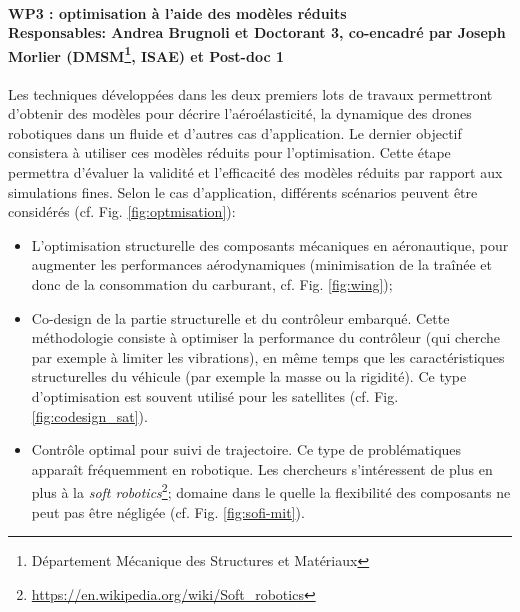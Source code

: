 \documentclass[12pt, french]{article}
\begin{document}
	
	\paragraph[\large WP3 : optimisation à l'aide des modèles réduits\\
	Responsables: Andrea Brugnoli et Doctorant 3, co-encadré par Joseph Morlier (DMSM, ISAE) et Post-doc 1\\]{\large WP3 : optimisation à l'aide des modèles réduits\\
		Responsables: Andrea Brugnoli et Doctorant 3, co-encadré par Joseph Morlier (DMSM\footnote{Département Mécanique des Structures et Matériaux}, ISAE) et Post-doc 1\\}
	
	Les techniques développées dans les deux premiers lots de travaux permettront d'obtenir des modèles pour décrire l'aéroélasticité, la dynamique des drones robotiques dans un fluide et d'autres cas d'application.
	Le dernier objectif consistera à utiliser ces modèles réduits pour l'optimisation. Cette étape permettra d'évaluer la validité et l'efficacité des modèles réduits par rapport aux simulations fines. Selon le cas d'application, différents scénarios peuvent être considérés (cf. Fig. \ref{fig:optmisation}): 
	\begin{itemize}
		\item L'optimisation structurelle des composants mécaniques en aéronautique, pour augmenter les performances aérodynamiques (minimisation de la traînée et donc de la consommation du carburant, cf. Fig. \ref{fig:wing}); 
		\item Co-design de la partie structurelle et du contrôleur embarqué. Cette méthodologie consiste à optimiser la performance du contrôleur (qui cherche par exemple à limiter les vibrations), en même temps que les caractéristiques structurelles du véhicule (par exemple la masse ou la rigidité). Ce type d'optimisation est souvent utilisé pour les satellites (cf. Fig. \ref{fig:codesign_sat}).
		\item Contrôle optimal pour suivi de trajectoire. Ce type de problématiques apparaît fréquemment en robotique. Les chercheurs s'intéressent de plus en plus à la \textit{soft robotics}\footnote{\url{https://en.wikipedia.org/wiki/Soft_robotics}}; domaine dans le quelle la flexibilité des composants ne peut pas être négligée (cf. Fig. \ref{fig:sofi-mit}).
	\end{itemize}
	
\end{document}
